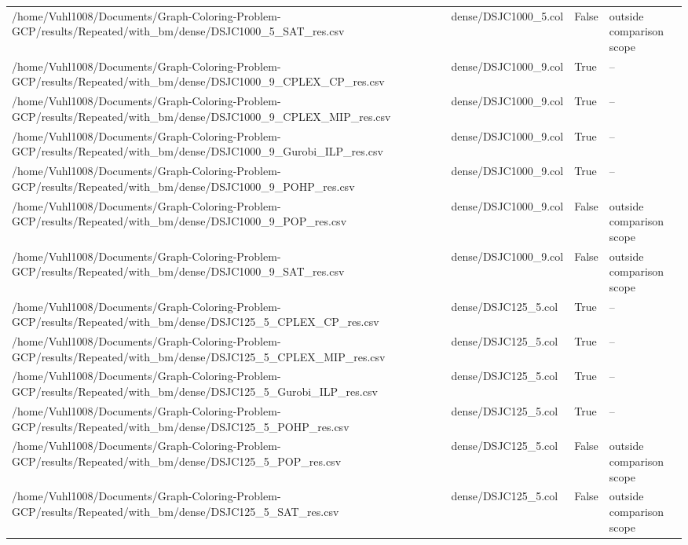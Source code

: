 \begin{table}[htbp]
\begin{tabular}{llll}
/home/Vuhl1008/Documents/Graph-Coloring-Problem-GCP/results/Repeated/with\_bm/dense/DSJC1000\_5\_SAT\_res.csv & dense/DSJC1000\_5.col & False & outside comparison scope \\
/home/Vuhl1008/Documents/Graph-Coloring-Problem-GCP/results/Repeated/with\_bm/dense/DSJC1000\_9\_CPLEX\_CP\_res.csv & dense/DSJC1000\_9.col & True & -- \\
/home/Vuhl1008/Documents/Graph-Coloring-Problem-GCP/results/Repeated/with\_bm/dense/DSJC1000\_9\_CPLEX\_MIP\_res.csv & dense/DSJC1000\_9.col & True & -- \\
/home/Vuhl1008/Documents/Graph-Coloring-Problem-GCP/results/Repeated/with\_bm/dense/DSJC1000\_9\_Gurobi\_ILP\_res.csv & dense/DSJC1000\_9.col & True & -- \\
/home/Vuhl1008/Documents/Graph-Coloring-Problem-GCP/results/Repeated/with\_bm/dense/DSJC1000\_9\_POHP\_res.csv & dense/DSJC1000\_9.col & True & -- \\
/home/Vuhl1008/Documents/Graph-Coloring-Problem-GCP/results/Repeated/with\_bm/dense/DSJC1000\_9\_POP\_res.csv & dense/DSJC1000\_9.col & False & outside comparison scope \\
/home/Vuhl1008/Documents/Graph-Coloring-Problem-GCP/results/Repeated/with\_bm/dense/DSJC1000\_9\_SAT\_res.csv & dense/DSJC1000\_9.col & False & outside comparison scope \\
/home/Vuhl1008/Documents/Graph-Coloring-Problem-GCP/results/Repeated/with\_bm/dense/DSJC125\_5\_CPLEX\_CP\_res.csv & dense/DSJC125\_5.col & True & -- \\
/home/Vuhl1008/Documents/Graph-Coloring-Problem-GCP/results/Repeated/with\_bm/dense/DSJC125\_5\_CPLEX\_MIP\_res.csv & dense/DSJC125\_5.col & True & -- \\
/home/Vuhl1008/Documents/Graph-Coloring-Problem-GCP/results/Repeated/with\_bm/dense/DSJC125\_5\_Gurobi\_ILP\_res.csv & dense/DSJC125\_5.col & True & -- \\
/home/Vuhl1008/Documents/Graph-Coloring-Problem-GCP/results/Repeated/with\_bm/dense/DSJC125\_5\_POHP\_res.csv & dense/DSJC125\_5.col & True & -- \\
/home/Vuhl1008/Documents/Graph-Coloring-Problem-GCP/results/Repeated/with\_bm/dense/DSJC125\_5\_POP\_res.csv & dense/DSJC125\_5.col & False & outside comparison scope \\
/home/Vuhl1008/Documents/Graph-Coloring-Problem-GCP/results/Repeated/with\_bm/dense/DSJC125\_5\_SAT\_res.csv & dense/DSJC125\_5.col & False & outside comparison scope \\

\end{tabular}
\end{table}

